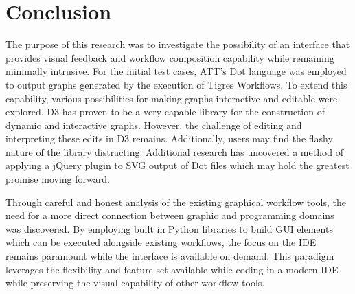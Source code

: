 \section{Conclusion}
The purpose of this research was to investigate the possibility of an interface that provides visual feedback and workflow composition capability while remaining minimally intrusive. For the initial test cases, ATT's Dot language was employed to output graphs generated by the execution of Tigres Workflows. To extend this capability, various possibilities for making graphs interactive and editable were explored. D3 has proven to be a very capable library for the construction of dynamic and interactive graphs. However, the challenge of editing and interpreting these edits in D3 remains. Additionally, users may find the flashy nature of the library distracting. Additional research has uncovered a method of applying a jQuery plugin to SVG output of Dot files which may hold the greatest promise moving forward.

Through careful and honest analysis of the existing graphical workflow tools, the need for a more direct connection between graphic and programming domains was discovered. By employing built in Python libraries to build GUI elements which can be executed alongside existing workflows, the focus on the IDE remains paramount while the interface is available on demand. This paradigm leverages the flexibility and feature set available while coding in a modern IDE while preserving the visual capability of other workflow tools. 

\label{sec:conc} 






